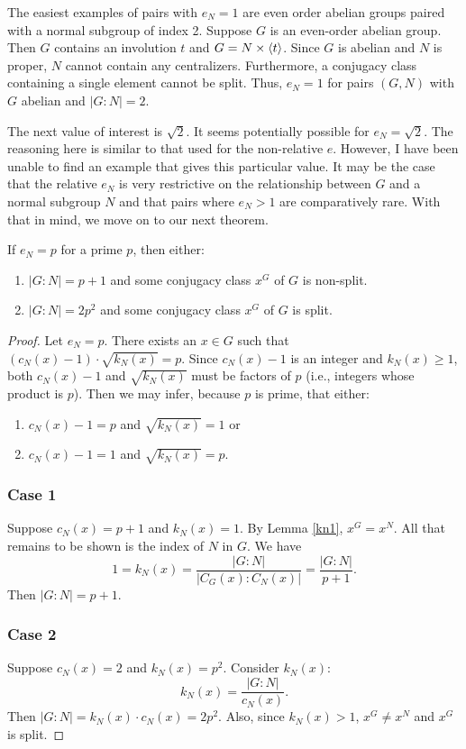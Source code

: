 \documentclass[main.tex]{subfiles}
\begin{document}
The easiest examples of pairs with $e_N = 1$ are even order abelian groups paired with a normal subgroup of index 2. Suppose $G$ is an even-order abelian group. Then $G$ contains an involution $t$ and $G = N \times \langle t \rangle$. Since $G$ is abelian and $N$ is proper, $N$ cannot contain any centralizers. Furthermore, a conjugacy class containing a single element cannot be split. Thus, $e_N = 1$ for pairs $(G, N)$ with $G$ abelian and $|G : N| = 2$.

The next value of interest is $\sqrt{2}$. It seems potentially possible for $e_N = \sqrt{2}$. The reasoning here is similar to that used for the non-relative $e$. However, I have been unable to find an example that gives this particular value. It may be the case that the relative $e_N$ is very restrictive on the relationship between $G$ and a normal subgroup $N$ and that pairs where $e_N > 1$ are comparatively rare. With that in mind, we move on to our next theorem.

\begin{theorem}
If $e_N = p$ for a prime $p$, then either:
\begin{enumerate}
	\item $|G:N| = p + 1$ and some conjugacy class $x^G$ of $G$ is non-split.
	\item $|G:N| = 2p^2$ and some conjugacy class $x^G$ of $G$ is split.
\end{enumerate}
\end{theorem}

\begin{proof}
Let $e_N = p$. There exists an $x \in G$ such that $(c_N(x) - 1) \cdot \sqrt{k_N(x)} = p$. Since $c_N(x) - 1$ is an integer and $k_N(x) \ge 1$, both $c_N(x) - 1$ and $\sqrt{k_N(x)}$ must be factors of $p$ (i.e., integers whose product is $p$). Then we may infer, because $p$ is prime, that either:
\begin{enumerate}
	\item $c_N(x) - 1 = p$ and $\sqrt{k_N(x)} = 1$ or
	\item $c_N(x) - 1 = 1$ and $\sqrt{k_N(x)} = p$.
\end{enumerate}

\subsubsection*{Case 1} Suppose $c_N(x) = p + 1$ and $k_N(x) = 1$. By Lemma \ref{kn1}, $x^G = x^N$. All that remains to be shown is the index of $N$ in $G$. We have
$$1 = k_N(x) = \frac{|G : N|}{|C_G(x):C_N(x)|} = \frac{|G : N|}{p + 1}\text{.}$$
Then $|G:N| = p+1$.

\subsubsection*{Case 2} Suppose $c_N(x) = 2$ and $k_N(x) = p^2$. Consider $k_N(x)$:
$$k_N(x) = \frac{|G:N|}{c_N(x)}\text{.}$$
Then $|G:N| = k_N(x) \cdot c_N(x) = 2p^2$. Also, since $k_N(x) > 1$, $x^G \ne x^N$ and $x^G$ is split.
\end{proof}
\end{document}
